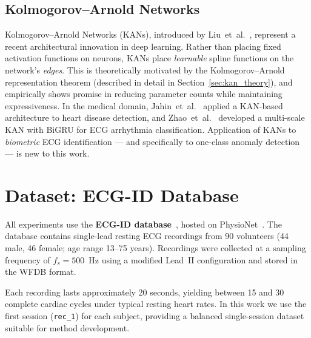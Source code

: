 \documentclass[12pt, a4paper]{article}
\begin{document}
\subsection{Kolmogorov--Arnold Networks}

Kolmogorov--Arnold Networks (KANs), introduced by Liu~et~al.~\cite{liu2024},
represent a recent architectural innovation in deep learning.
Rather than placing fixed activation functions on neurons,
KANs place \textit{learnable} spline functions on the network's
\textit{edges}. This is theoretically motivated by the
Kolmogorov--Arnold representation theorem (described in detail in
Section~\ref{sec:kan_theory}), and empirically shows promise in reducing
parameter counts while maintaining expressiveness.
In the medical domain, Jahin~et~al.~\cite{jahin2025} applied a KAN-based
architecture to heart disease detection, and Zhao~et~al.~\cite{zhao2025}
developed a multi-scale KAN with BiGRU for ECG arrhythmia classification.
Application of KANs to \textit{biometric} ECG identification --- and
specifically to one-class anomaly detection --- is new to this work.

\section{Dataset: ECG-ID Database}
\label{sec:dataset}

All experiments use the \textbf{ECG-ID database}~\cite{lugovaya2005},
hosted on PhysioNet~\cite{goldberger2000}. The database contains single-lead
resting ECG recordings from 90 volunteers (44 male, 46 female; age range
13--75 years). Recordings were collected at a sampling frequency of
$f_s = 500$~Hz using a modified Lead~II configuration and stored in
the WFDB format.

Each recording lasts approximately 20 seconds, yielding between 15 and 30
complete cardiac cycles under typical resting heart rates.
In this work we use the first session (\texttt{rec\_1}) for each subject,
providing a balanced single-session dataset suitable for method development.
\end{document}
